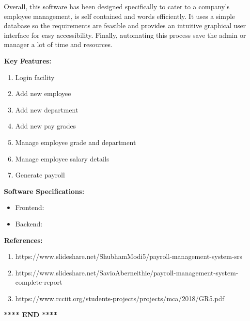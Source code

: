 \documentclass[12pt]{article}
\begin{document}
\noindent
Overall, this software has been designed specifically to cater to a company's employee management, is self contained and words efficiently. It uses a simple database so the requirements are feasible and provides an intuitive graphical user interface for easy accessibility. Finally, automating this process save the admin or manager a lot of time and resources. 

\noindent
\textbf{Key Features:}
\begin{enumerate}
    \item Login facility
    \item Add new employee
    \item Add new department
    \item Add new pay grades
    \item Manage employee grade and department
    \item Manage employee salary details
    \item Generate payroll
\end{enumerate}
\textbf{Software Specifications:}
\begin{itemize}
    \item Frontend: 
    \item Backend: 
\end{itemize}

\noindent
\textbf{References:}
\begin{enumerate}
    \item https://www.slideshare.net/ShubhamModi5/payroll-management-system-srs
    \item https://www.slideshare.net/SavioAberneithie/payroll-management-system-complete-report
    \item https://www.rcciit.org/students-projects/projects/mca/2018/GR5.pdf
\end{enumerate}

\begin{center}
    \textbf{**** END ****}
\end{center}
\end{document}
